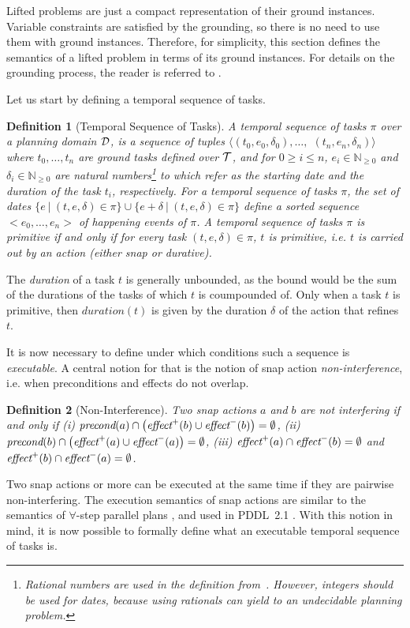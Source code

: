\documentclass[letterpaper]{article} %
\newtheorem{definition}{Definition}
\newcommand{\pre}{\text{\it precond}}
\newcommand{\add}{\text{\it effect}^{+}}
\newcommand{\del}{\text{\it effect}^{-}}
\begin{document}
  Lifted problems are just a compact representation of their ground instances. Variable constraints are satisfied by the grounding, so there is no need to use them with ground instances. Therefore, for simplicity, this section defines the semantics of a lifted problem in terms of its ground instances. For details on the grounding process, the reader is referred to \cite{behnke20,ramoul17}.

Let us start by defining a temporal sequence of tasks.
\begin{definition}[Temporal Sequence of Tasks] %
  A \emph{temporal sequence of tasks} $\pi$ over a planning domain $\cal{D}$, is a sequence of tuples $\langle (t_0, e_0, \delta_0), \ldots,$ $(t_n, e_n, \delta_n) \rangle$ where $t_0, \ldots, t_n$ are ground tasks defined over $\cal{T}$, and for $0 \ge i \le n$, $e_i \in \mathbb{N}_{\geq 0}$ and $\delta_i \in \mathbb{N}_{\geq 0}$ are natural numbers\footnote{
    Rational numbers are used in the definition from~\citet{fox03}. However, integers should be used for dates, because using rationals can yield to an undecidable planning problem.}
  to which refer as the starting date and the duration of the task $t_i$, respectively.
  For a temporal sequence of tasks $\pi$, the set of dates $\{e \ | \ (t, e, \delta) \in \pi\} \cup \{e + \delta \ | \ (t, e, \delta) \in \pi\}$  define a sorted sequence $<e_0, \ldots, e_n>$ of \emph{happening events} of $\pi$. %
A temporal sequence of tasks  $\pi$ is primitive if and only if for every task  $(t, e, \delta) \in \pi$, $t$ is primitive, i.e. $t$ is carried out by an action (either snap or durative).
\end{definition}

The \emph{duration} of a task $t$ is generally unbounded, as the bound would be the sum of the durations of the tasks of which $t$ is coumpounded of. Only when a task $t$ is primitive, then $duration(t)$ is given by the duration $\delta$ of the action that refines $t$.


It is now necessary to define under which conditions such a sequence is {\it executable}. A central notion for that is the notion of snap action {\it non-interference}, i.e. when preconditions and effects do not overlap.
\begin{definition}[Non-Interference]
Two snap actions $a$ and $b$ are \emph{not interfering} if and only if (i) $\pre(a) \cap \bigl(\add(b) \cup \del(b)\bigr) = \emptyset$, (ii) $\pre(b) \cap \bigl(\add(a) \cup \del(a)\bigr) = \emptyset$, (iii) $\add(a) \cap \del(b) = \emptyset$ and  $\add(b) \cap \del(a) = \emptyset$.
\end{definition}
Two snap actions or more can be executed at the same time if they are pairwise non-interfering. The execution semantics of snap actions are similar to the semantics of $\forall$-step parallel plans \cite{rintanen06}, and used in PDDL~2.1 \cite{fox03}. With this notion in mind, it is now possible to formally define what an executable temporal sequence of tasks is.
\end{document}
